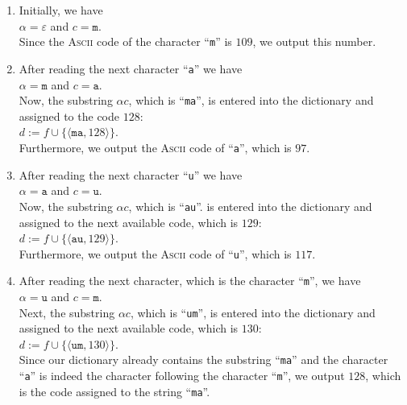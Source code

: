 \begin{enumerate}
\item Initially, we have
      \\[0.2cm]
      \hspace*{1.3cm}
      $\alpha = \varepsilon$ \quad and \quad $c = \mathtt{m}$.
      \\[0.2cm]
      Since the \textsc{Ascii} code of the character ``\texttt{m}'' is $109$, we output this number.
\item After reading the next character ``\texttt{a}'' we have
      \\[0.2cm]
      \hspace*{1.3cm}
      $\alpha = \mathtt{m}$ \quad and \quad $c = \mathtt{a}$.
      \\[0.2cm]
      Now, the substring $\alpha c$, which is ``\texttt{ma}'', is entered into the dictionary and
      assigned to the code $128$:
      \\[0.2cm]
      \hspace*{1.3cm}
      $d \mathtt{:=} f \cup \{\langle \mathtt{ma}, 128 \rangle\}$.
      \\[0.2cm]
      Furthermore, we output the \textsc{Ascii} code of ``\texttt{a}'', which is $97$.
\item After reading the next character ``\texttt{u}'' we have
      \\[0.2cm]
      \hspace*{1.3cm}
      $\alpha = \mathtt{a}$ \quad and \quad $c = \mathtt{u}$.
      \\[0.2cm]
      Now, the substring $\alpha c$, which is ``\texttt{au}''. is entered into the dictionary and
      assigned to the next available code, which is $129$:
      \\[0.2cm]
      \hspace*{1.3cm}
      $d \mathtt{:=} f \cup \{\langle \mathtt{au}, 129 \rangle\}$.
      \\[0.2cm]
      Furthermore, we output the \textsc{Ascii} code of ``\texttt{u}'', which is $117$.
\item After reading the next character, which is the character ``\texttt{m}'', we have
      \\[0.2cm]
      \hspace*{1.3cm}
      $\alpha = \mathtt{u}$ \quad and \quad $c = \mathtt{m}$.
      \\[0.2cm]
      Next, the substring $\alpha c$, which is ``\texttt{um}'', is entered into the dictionary and
      assigned to the next available code, which is $130$:
      \\[0.2cm]
      \hspace*{1.3cm}
      $d \mathtt{:=} f \cup \{\langle \mathtt{um}, 130 \rangle\}$.
      \\[0.2cm]
      Since our dictionary already contains the substring ``\texttt{ma}'' and the character
      ``\texttt{a}'' is indeed the character following the character ``\texttt{m}'', we output
      $128$, which is the code assigned to the string ``\texttt{ma}''.


\end{enumerate}
